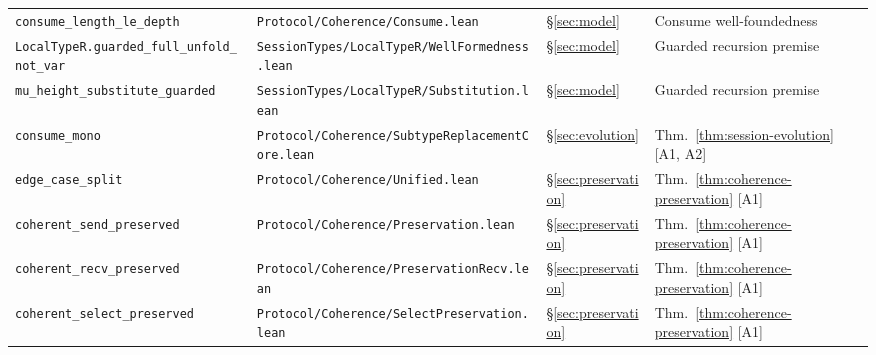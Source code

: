 \documentclass[a4paper,10pt,twocolumn,english]{article}
\numberwithin{equation}{section}
\theoremstyle{paperdef}
\theoremstyle{paperplain}
\theoremstyle{paperdef}
\theoremstyle{paperremark}
\begin{document}
\begin{table}[H]
\begin{tabularx}{\textwidth}{L{0.27\textwidth}L{0.37\textwidth}L{0.06\textwidth}>{\raggedright\arraybackslash}X}
		\texttt{consume\_length\_le\_depth}                                       & \texttt{Protocol/\allowbreak Coherence/\allowbreak}\mbox{\texttt{Consume.lean}}                                                   & \S\ref{sec:model}        & Consume well-foundedness                   \\
		\texttt{LocalTypeR.\allowbreak guarded\_full\_unfold\_not\_var}           & \texttt{SessionTypes/\allowbreak LocalTypeR/\allowbreak}\mbox{\texttt{WellFormedness.lean}}                                       & \S\ref{sec:model}        & Guarded recursion premise                  \\
		\texttt{mu\_height\_\allowbreak substitute\_guarded}                      & \texttt{SessionTypes/\allowbreak LocalTypeR/\allowbreak}\mbox{\texttt{Substitution.lean}}                                         & \S\ref{sec:model}        & Guarded recursion premise                  \\
		\texttt{consume\_mono}                                                    & \texttt{Protocol/\allowbreak Coherence/\allowbreak}\mbox{\texttt{SubtypeReplacementCore.lean}}                                    & \S\ref{sec:evolution}    & Thm.~\ref{thm:session-evolution} [A1, A2]  \\
		\texttt{edge\_case\_split}                                                & \texttt{Protocol/\allowbreak Coherence/\allowbreak}\mbox{\texttt{Unified.lean}}                                                   & \S\ref{sec:preservation} & Thm.~\ref{thm:coherence-preservation} [A1] \\
		\texttt{coherent\_send\_\allowbreak preserved}                            & \texttt{Protocol/\allowbreak Coherence/\allowbreak}\mbox{\texttt{Preservation.lean}}                                              & \S\ref{sec:preservation} & Thm.~\ref{thm:coherence-preservation} [A1] \\
		\texttt{coherent\_recv\_\allowbreak preserved}                            & \texttt{Protocol/\allowbreak Coherence/\allowbreak}\mbox{\texttt{PreservationRecv.lean}}                                          & \S\ref{sec:preservation} & Thm.~\ref{thm:coherence-preservation} [A1] \\
		\texttt{coherent\_select\_\allowbreak preserved}                          & \texttt{Protocol/\allowbreak Coherence/\allowbreak}\mbox{\texttt{SelectPreservation.lean}}                                        & \S\ref{sec:preservation} & Thm.~\ref{thm:coherence-preservation} [A1] \\

\end{tabularx}
\end{table}
\end{document}
